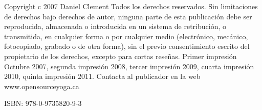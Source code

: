 Copyright c 2007 Daniel Clement
Todos los derechos reservados. Sin limitaciones de derechos bajo derechos de autor, ninguna parte de esta publicación debe ser reproducida, almacenada o introducida en un sistema de
retribución, o transmitida, en cualquier forma o por cualquier medio (electrónico, mecánico, fotocopiado, grabado o de otra forma), sin el previo consentimiento escrito del propietario de los derechos, excepto para cortas reseñas.
Primer impresión Octubre 2007, segunda impresión 2008, tercer impresión 2009, cuarta impresión 2010, quinta impresión 2011.
Contacta al publicador en la web www.opensourceyoga.ca

ISBN: 978-0-9735820-9-3
